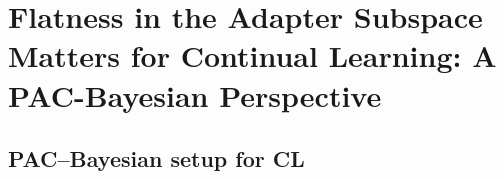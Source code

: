 \documentclass[10pt]{article} %
\begin{document}




\section{Flatness in the Adapter Subspace Matters for Continual Learning: A PAC-Bayesian Perspective}
\label{section PAC}





\subsection{PAC–Bayesian setup for CL}

\end{document}
